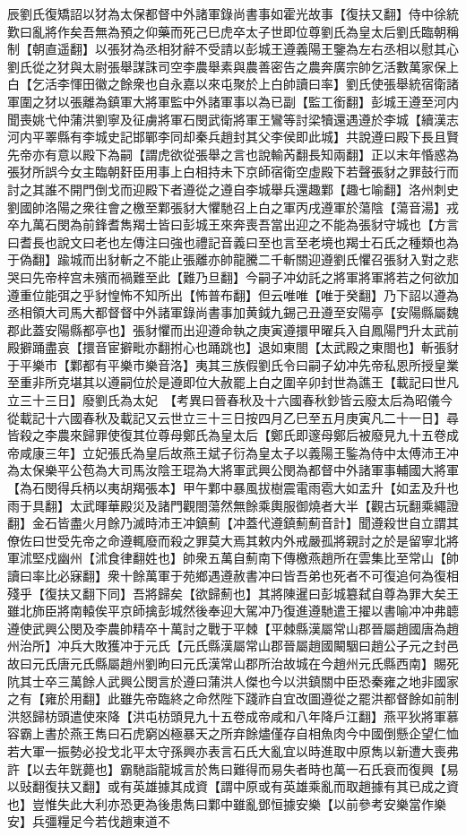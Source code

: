 辰劉氏復矯詔以犲為太保都督中外諸軍錄尚書事如霍光故事【復扶又翻】侍中徐統歎曰亂將作矣吾無為預之仰藥而死己巳虎卒太子世即位尊劉氏為皇太后劉氏臨朝稱制【朝直遥翻】以張犲為丞相犲辭不受請以彭城王遵義陽王鑒為左右丞相以慰其心劉氏從之犲與太尉張舉謀誅司空李農舉素與農善密告之農奔廣宗帥乞活數萬家保上白【乞活李惲田徽之餘衆也自永嘉以來屯聚於上白帥讀曰率】劉氏使張舉統宿衛諸軍圍之犲以張離為鎮軍大將軍監中外諸軍事以為已副【監工銜翻】彭城王遵至河内聞喪姚弋仲蒲洪劉寧及征虜將軍石閔武衛將軍王鸞等討梁犢還遇遵於李城【續漢志河内平睪縣有李城史記邯鄲李同却秦兵趙封其父李侯即此城】共說遵曰殿下長且賢先帝亦有意以殿下為嗣【謂虎欲從張舉之言也說輸芮翻長知兩翻】正以末年惛惑為張犲所誤今女主臨朝姧臣用事上白相持未下京師宿衛空虛殿下若聲張豺之罪鼓行而討之其誰不開門倒戈而迎殿下者遵從之遵自李城舉兵還趣鄴【趣七喻翻】洛州刺史劉國帥洛陽之衆往會之檄至鄴張豺大懼馳召上白之軍丙戌遵軍於蕩陰【蕩音湯】戎卒九萬石閔為前鋒耆雋羯士皆曰彭城王來奔喪吾當出迎之不能為張豺守城也【方言曰耆長也說文曰老也左傳注曰強也禮記音義曰至也言至老境也羯士石氏之種類也為于偽翻】踰城而出豺斬之不能止張離亦帥龍騰二千斬關迎遵劉氏懼召張豺入對之悲哭曰先帝梓宫未殯而禍難至此【難乃旦翻】今嗣子冲幼託之將軍將軍將若之何欲加遵重位能弭之乎豺惶怖不知所出【怖普布翻】但云唯唯【唯于癸翻】乃下詔以遵為丞相領大司馬大都督督中外諸軍錄尚書事加黄鉞九錫己丑遵至安陽亭【安陽縣屬魏郡此蓋安陽縣都亭也】張豺懼而出迎遵命執之庚寅遵擐甲曜兵入自鳳陽門升太武前殿擗踊盡哀【擐音宦擗毗亦翻拊心也踊跳也】退如東閤【太武殿之東閤也】斬張豺于平樂市【鄴都有平樂市樂音洛】夷其三族假劉氏令曰嗣子幼冲先帝私恩所授皇業至重非所克堪其以遵嗣位於是遵即位大赦罷上白之圍辛卯封世為譙王【載記曰世凡立三十三日】廢劉氏為太妃　【考異曰晉春秋及十六國春秋鈔皆云廢太后為昭儀今從載記十六國春秋及載記又云世立三十三日按四月乙巳至五月庚寅凡二十一日】尋皆殺之李農來歸罪使復其位尊母鄭氏為皇太后【鄭氏即邃母鄭后被廢見九十五卷成帝咸康三年】立妃張氏為皇后故燕王斌子衍為皇太子以義陽王鍳為侍中太傅沛王冲為太保樂平公苞為大司馬汝陰王琨為大將軍武興公閔為都督中外諸軍事輔國大將軍【為石閔得兵柄以夷胡羯張本】甲午鄴中暴風拔樹震電雨雹大如盂升【如盂及升也雨于具翻】太武暉華殿災及諸門觀閤蕩然無餘乘輿服御燒者大半【觀古玩翻乘繩證翻】金石皆盡火月餘乃滅時沛王冲鎮薊【冲蓋代遵鎮薊薊音計】聞遵殺世自立謂其僚佐曰世受先帝之命遵輒廢而殺之罪莫大焉其敕内外戒嚴孤將親討之於是留寧北將軍沭堅戍幽州【沭食律翻姓也】帥衆五萬自薊南下傳檄燕趙所在雲集比至常山【帥讀曰率比必寐翻】衆十餘萬軍于苑鄉遇遵赦書冲曰皆吾弟也死者不可復追何為復相殘乎【復扶又翻下同】吾將歸矣【欲歸薊也】其將陳暹曰彭城簒弑自尊為罪大矣王雖北斾臣將南轅俟平京師擒彭城然後奉迎大駕冲乃復進遵馳遣王擢以書喻冲冲弗聼遵使武興公閔及李農帥精卒十萬討之戰于平棘【平棘縣漢屬常山郡晉屬趙國唐為趙州治所】冲兵大敗獲冲于元氏【元氏縣漢屬常山郡晉屬趙國闞駰曰趙公子元之封邑故曰元氏唐元氏縣屬趙州劉昫曰元氏漢常山郡所治故城在今趙州元氏縣西南】賜死阬其士卒三萬餘人武興公閔言於遵曰蒲洪人傑也今以洪鎮關中臣恐秦雍之地非國家之有【雍於用翻】此雖先帝臨終之命然陛下踐祚自宜改圖遵從之罷洪都督餘如前制洪怒歸枋頭遣使來降【洪屯枋頭見九十五卷成帝咸和八年降戶江翻】燕平狄將軍慕容霸上書於燕王雋曰石虎窮凶極暴天之所弃餘燼僅存自相魚肉今中國倒懸企望仁恤若大軍一振勢必投戈北平太守孫興亦表言石氏大亂宜以時進取中原雋以新遭大喪弗許【以去年皝薨也】霸馳詣龍城言於雋曰難得而易失者時也萬一石氏衰而復興【易以䜴翻復扶又翻】或有英雄據其成資【謂中原或有英雄乘亂而取趙據有其已成之資也】豈惟失此大利亦恐更為後患雋曰鄴中雖亂鄧恒據安樂【以前參考安樂當作樂安】兵彊糧足今若伐趙東道不